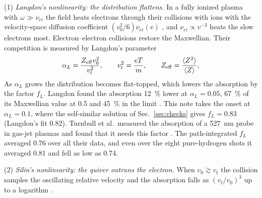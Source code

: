 \documentclass[11pt]{article}
\numberwithin{equation}{section}
\begin{document}
{\noindent}(1) \emph{Langdon's nonlinearity: the distribution flattens.} In a
fully ionized plasma with $\omega\gg\nu_{ei}$ the field heats electrons through
their collisions with ions with the velocity-space diffusion coefficient
$(v_0^2/6)\nu_{ei}(v)$ \cite{Langdon1980}, and $\nu_{ei}\propto v^{-3}$ heats the slow
electrons most. Electron--electron collisions restore the Maxwellian. Their
competition is measured by Langdon's parameter
\begin{equation}
\alpha_L=\frac{Z_{\rm eff}v_0^2}{v_t^2},\qquad v_t^2=\frac{eT}{m},\qquad
Z_{\rm eff}=\frac{\langle Z^2\rangle}{\langle Z\rangle},
\label{eq:alphaL}
\end{equation}
As $\alpha_L$ grows the distribution becomes flat-topped, which lowers the absorption
by the factor $f_L$. Langdon found the absorption 12~\% lower at $\alpha_L=0.05$, 67~\%
of its Maxwellian value at 0.5 and 45~\% in the limit \cite{Langdon1980}.
This note takes the onset at $\alpha_L=0.1$, where the self-similar solution of
Sec.~\ref{sec:checks} gives $f_L=0.83$ (Langdon's fit 0.82). Turnbull
et al.\ measured the absorption of a 527~nm probe in gas-jet plasmas and found that it
needs this factor \cite{Turnbull2023}. The path-integrated $f_L$ averaged 0.76 over all
their data, and even over the eight pure-hydrogen shots it averaged 0.81 and fell as
low as 0.74.

{\noindent}(2) \emph{Silin's nonlinearity: the quiver outruns the electron.} When
$v_0\gtrsim v_t$ the collision samples the oscillating relative velocity and the
absorption falls as $(v_t/v_0)^3$ up to a logarithm \cite{Silin1965}.
\end{document}
